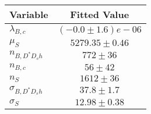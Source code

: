 \begin{tabular}[t]{lc}
\hline
Variable &Fitted Value\\
\hline\hline
$\lambda_{B,c}$&$(-0.0\pm1.6)e-06$\\
\hline
$\mu_S$&$5279.35\pm0.46$\\
\hline
$n_{B, D^* D_s h}$&$772\pm36$\\
\hline
$n_{B,c}$&$56\pm42$\\
\hline
$n_S$&$1612\pm36$\\
\hline
$\sigma_{B, D^* D_s h}$&$37.8\pm1.7$\\
\hline
$\sigma_S$&$12.98\pm0.38$\\
\hline
\end{tabular}
